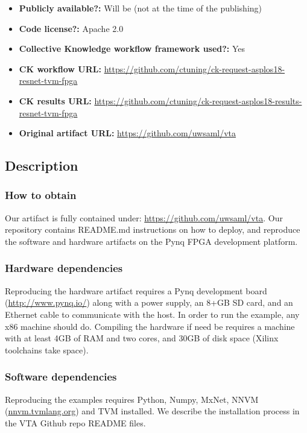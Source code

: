 \documentclass[sigconf]{acmart}
\begin{document}
\begin{itemize}
  \item {\bf Publicly available?:} Will be (not at the time of the publishing)
  \item {\bf Code license?:} Apache 2.0
  \item {\bf Collective Knowledge workflow framework used?:} Yes
  \item {\bf CK workflow URL:} \url{https://github.com/ctuning/ck-request-asplos18-resnet-tvm-fpga}
  \item {\bf CK results URL:} \url{https://github.com/ctuning/ck-request-asplos18-results-resnet-tvm-fpga}
  \item {\bf Original artifact URL:} \url{https://github.com/uwsaml/vta}
\end{itemize}

\subsection{Description}

\subsubsection{How to obtain}

Our artifact is fully contained under: \url{https://github.com/uwsaml/vta}.
Our repository contains README.md instructions on how to deploy, and reproduce the software and hardware artifacts on the Pynq FPGA development platform.

\subsubsection{Hardware dependencies}

Reproducing the hardware artifact requires a Pynq development board (\url{http://www.pynq.io/}) along with a power supply, an 8+GB SD card, and an Ethernet cable to communicate with the host. In order to run the example, any x86 machine should do. Compiling the hardware if need be requires a machine with at least 4GB of RAM and two cores, and 30GB of disk space (Xilinx toolchains take space).

\subsubsection{Software dependencies}

Reproducing the examples requires Python, Numpy, MxNet, NNVM (\url{nnvm.tvmlang.org}) and TVM installed. We describe the installation process in the VTA Github repo README files.
\end{document}
